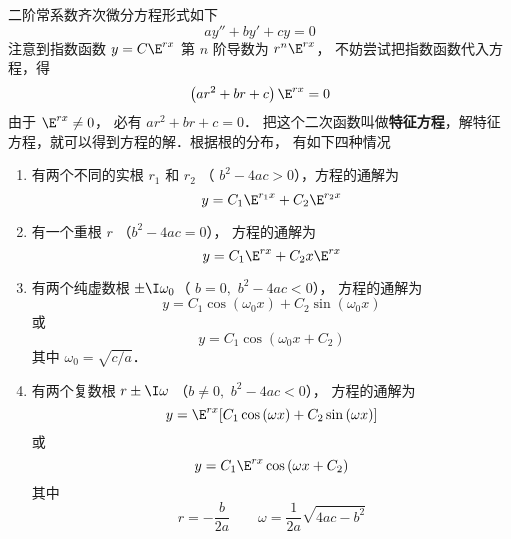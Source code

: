 

二阶常系数齐次微分方程形式如下
\begin{equation}
ay'' + by' + cy = 0
\end{equation}
注意到指数函数 $y = C{\E^{rx}}$ 第 $n$ 阶导数为 ${r^n}{\E^{rx}}$， 不妨尝试把指数函数代入方程，得
\begin{equation}
\left( {a{r^2} + br + c} \right){\E^{rx}} = 0
\end{equation}
由于 ${\E^{rx}} \ne 0$， 必有 $a{r^2} + br + c = 0$． 把这个二次函数叫做\textbf{特征方程}，解特征方程，就可以得到方程的解．根据根的分布， 有如下四种情况

\begin{enumerate}
\item 有两个不同的实根 ${r_1}$ 和  ${r_2}$ （ ${b^2} - 4ac > 0$），方程的通解为
 \begin{equation}
y = {C_1}{\E^{{r_1}x}} + {C_2}{\E^{{r_2}x}}
\end{equation}
\item 有一个重根 $r$ （${b^2} - 4ac = 0$）， 方程的通解为
\begin{equation}\label{Ode2_eq4}
y = {C_1}{\E^{rx}} + {C_2}x{\E^{rx}}
\end{equation}
\item 有两个纯虚数根 $\pm \I \omega_0$（ ${b = 0,\,\,{b^2} - 4ac < 0}$）， 方程的通解为
\begin{equation}
y = {C_1}\cos \left( {{\omega _0}x} \right) + {C_2}\sin \left( {{\omega _0}x} \right)
\end{equation}
或 
\begin{equation}
y = {C_1}\cos \left( {{\omega _0}x + {C_2}} \right)
\end{equation} 
其中 ${\omega _0} = \sqrt {{c}/{a}}$． 

\item 有两个复数根 $r \pm \I\omega $ （${b \ne 0,\,\,{b^2} - 4ac < 0}$）， 方程的通解为
\begin{equation}\label{Ode2_eq7}
y = {\E^{rx}}[ {{C_1}\cos \left( {\omega x} \right) + {C_2}\sin \left( {\omega x} \right)} ]
\end{equation} 
或 
\begin{equation}
y = {C_1}{\E^{rx}}\cos \left( {\omega x + {C_2}} \right)
\end{equation} 
其中
\begin{equation}
r =  - \frac{b}{2a} \qquad \omega  = \frac{1}{2a}\sqrt {4ac - b^2} 
\end{equation}

\end{enumerate}

